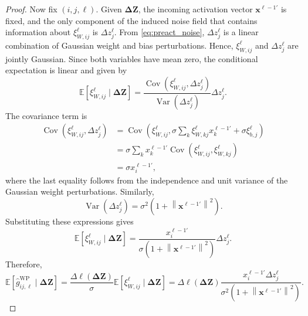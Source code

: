 \begin{proof}
Now fix \((i,j,\ell)\). Given $\boldsymbol{\Delta Z}$, the incoming activation vector $\mathbf{x}^{\ell-1\prime}$ is fixed, and the only component of the induced noise field that contains information about $\xi^\ell_{W,ij}$ is $\Delta z^\ell_j$. From \eqref{eq:preact_noise}, $\Delta z^\ell_j$ is a linear combination of Gaussian weight and bias perturbations. Hence, $\xi^\ell_{W,ij}$ and $\Delta z^\ell_j$ are jointly Gaussian. Since both variables have mean zero, the conditional expectation is linear and given by
\begin{equation}
\mathbb{E}\!\left[\xi^\ell_{W,ij} \mid \boldsymbol{\Delta Z}\right]
=
\frac{
\operatorname{Cov}\!\left(\xi^\ell_{W,ij}, \Delta z^\ell_j\right)
}{
\operatorname{Var}\!\left(\Delta z^\ell_j\right)
}
\Delta z^\ell_j .
\end{equation}
The covariance term is
\begin{align}
\operatorname{Cov}\!\left(\xi^\ell_{W,ij}, \Delta z^\ell_j\right)
&=
\operatorname{Cov}\!\left(
\xi^\ell_{W,ij},
\sigma \sum_k \xi^\ell_{W,kj} x_k^{\ell-1\prime}
+
\sigma \xi^\ell_{b,j}
\right) \\
&=
\sigma \sum_k x_k^{\ell-1\prime}
\operatorname{Cov}\!\left(\xi^\ell_{W,ij}, \xi^\ell_{W,kj}\right) \\
&=
\sigma x_i^{\ell-1\prime},
\end{align}
where the last equality follows from the independence and unit variance of the Gaussian weight perturbations. Similarly,
\begin{equation}
\operatorname{Var}\!\left(\Delta z^\ell_j\right)
=
\sigma^2 \left(1+\left\|\mathbf{x}^{\ell-1\prime}\right\|^2\right).
\end{equation}
Substituting these expressions gives
\begin{equation}
\mathbb{E}\!\left[\xi^\ell_{W,ij} \mid \boldsymbol{\Delta Z}\right]
=
\frac{x_i^{\ell-1\prime}}{\sigma \left(1+\left\|\mathbf{x}^{\ell-1\prime}\right\|^2\right)}
\Delta z^\ell_j.
\end{equation}
Therefore,
\begin{equation}
\mathbb{E}\!\left[
\widehat{g}^{\mathrm{WP}}_{ij,\ell}
\mid
\boldsymbol{\Delta Z}
\right]
=
\frac{\Delta \ell(\boldsymbol{\Delta Z})}{\sigma}
\mathbb{E}\!\left[\xi^\ell_{W,ij} \mid \boldsymbol{\Delta Z}\right]
=
\Delta \ell(\boldsymbol{\Delta Z})
\frac{x_i^{\ell-1\prime}\Delta z^\ell_j}
{\sigma^2 \left(1+\left\|\mathbf{x}^{\ell-1\prime}\right\|^2\right)}.
\end{equation}


\end{proof}
